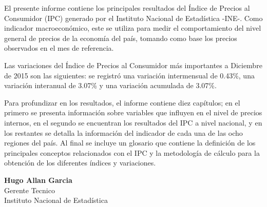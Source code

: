 El presente informe contiene los principales resultados del Índice de Precios al Consumidor (IPC) generado por el Instituto
Nacional de Estadística -INE-. Como indicador macroeconómico, este se utiliza para medir el comportamiento del nivel
general de precios de la economía del país, tomando como base los precios observados en el mes de referencia.

Las variaciones del Índice de Precios al Consumidor más importantes a Diciembre de 2015 son las siguientes: se registró
una variación intermensual de 0.43\%, una variación interanual de 3.07\% y una variación acumulada de 3.07\%.

Para profundizar en los resultados, el informe contiene diez capítulos; en el primero se presenta información sobre variables
que influyen en el nivel de precios internos, en el segundo se encuentran los resultados del IPC a nivel nacional,
y en los restantes se detalla la información del indicador de cada una de las ocho regiones del país. Al final se incluye un
glosario que contiene la definición de los principales conceptos relacionados con el IPC y la metodología de cálculo para la
obtención de los diferentes índices y variaciones.

\begin{center}
\textbf{Hugo Allan Garcia}\\
Gerente Tecnico\\
Instituto Nacional de Estadística
\end{center}